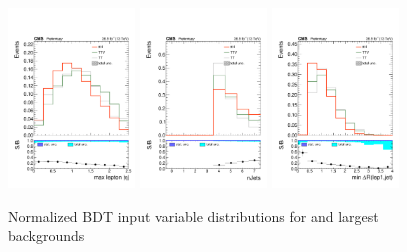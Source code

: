 \begin{figure}[htp]
\centering
\includegraphics[width=0.3\textwidth]{ch9_figs/kinMVA_input_max_Lep_eta.pdf}
\includegraphics[width=0.3\textwidth]{ch9_figs/kinMVA_input_numJets.pdf}
\includegraphics[width=0.3\textwidth]{ch9_figs/kinMVA_input_mindr_lep1_jet.pdf}
\caption[Signal extraction BDT input variables]{Normalized BDT input variable distributions for \tth and largest backgrounds}
\label{fig:inputs1}
\end{figure}


